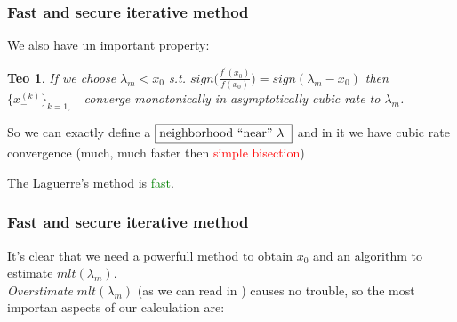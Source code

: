 \documentclass{beamer}
\theoremstyle{definition} \newtheorem{de}{Def}
\theoremstyle{remark} \newtheorem{os}[de]{Remark}
\theoremstyle{plain} \newtheorem{te}[de]{Teo}
\theoremstyle{plain} \newtheorem{co}[de]{Cor}
\theoremstyle{plain} \newtheorem{pr}[de]{Prop}
\theoremstyle{plain} \newtheorem{lem}[de]{Lemm}
\theoremstyle{remark} \newtheorem{rem}[de]{Remark}
\begin{document}

\begin{frame}
\frametitle{Fast and secure iterative method}

We also have un important property:

\begin{te}
  If we choose $\lambda_m < x_0$ s.t. 
$sign \Big( \frac{f^{'}(x_0)}{f(x_0)} \Big) = sign(\lambda_m - x_0)$ then 
$\{ x_{-}^{(k)} \}_{k=1,\dots}$ converge monotonically in asymptotically 
cubic rate to $\lambda_m$. 
\end{te}

\pause

So we can exactly define a $\fbox{neighborhood ``near'' $\lambda$ }$ and in it we
have cubic rate convergence (much, much faster then \textcolor{red}{simple bisection}) 

\pause


\pause

The Laguerre's method is \textcolor{green}{fast}.

\end{frame}


\begin{frame}
\frametitle{Fast and secure iterative method}

It's clear that we need a powerfull method to obtain $x_{0}$ and an algorithm to 
estimate $mlt(\lambda_m)$. \\
\emph{Overstimate} $mlt(\lambda_m)$ (as we can read in \cite{secondary}) causes no trouble, so the most importan aspects of our calculation are: 


\end{frame}
\end{document}
